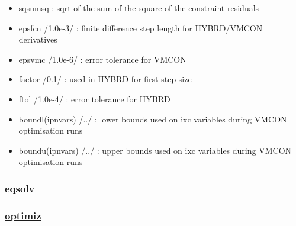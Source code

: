 \documentclass[]{article}
\begin{document}
\begin{itemize}
\begin{itemize}
    (146) fcpttf : F-value for TF coil current per turn limit
    (constraint equation 77)
  \item
    (147) freinke : F-value for Reinke detachment criterion (constraint
    equation 78)
  \item
    (148) fzactual : fraction of impurity at SOL with Reinke detachment
    criterion
  \item
    (149) fbmaxcs : F-value for max peak CS field (con. 79, itvar 149)
  \item
    (150) plasmod\_fcdp : (P\_CD - Pheat)/(Pmax-Pheat),i.e. ratio of CD
    power over available power
  \item
    (151) plasmod\_fradc : Pline\_Xe / (Palpha + Paux - PlineAr - Psync
    - Pbrad)
  \item
    (152) fbmaxcs : Ratio of separatrix density to Greenwald density
  \end{itemize}
\item
  sqsumsq : sqrt of the sum of the square of the constraint residuals
\item
  epsfcn /1.0e-3/ : finite difference step length for HYBRD/VMCON
  derivatives
\item
  epsvmc /1.0e-6/ : error tolerance for VMCON
\item
  factor /0.1/ : used in HYBRD for first step size
\item
  ftol /1.0e-4/ : error tolerance for HYBRD
\item
  boundl(ipnvars) /../ : lower bounds used on ixc variables during VMCON
  optimisation runs
\item
  boundu(ipnvars) /../ : upper bounds used on ixc variables during VMCON
  optimisation runs
\end{itemize}

\subsubsection{\texorpdfstring{\href{eqsolv.html}{eqsolv}}{eqsolv}}\label{eqsolv}

\subsubsection{\texorpdfstring{\href{optimiz.html}{optimiz}}{optimiz}}\label{optimiz}
\end{document}
